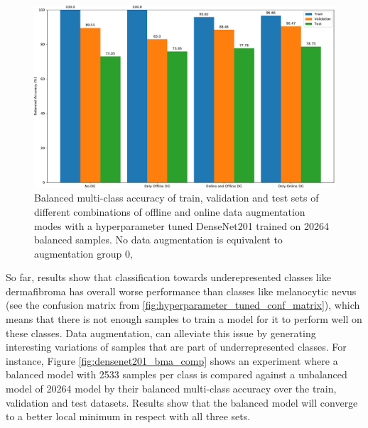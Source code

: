     \begin{figure}[ht]
        \centering
        \includegraphics[width=\textwidth]{figs/data_aug_mode_bal_acc_comp.pdf}
        \caption{Balanced multi-class accuracy of train, validation and test sets of different combinations of offline and online data augmentation modes with a hyperparameter tuned DenseNet201 trained on 20264 balanced samples. No data augmentation is equivalent to augmentation group 0, }
        \label{fig:data_aug_mode_bal_acc_comp}
    \end{figure}
    
    So far, results show that classification towards underepresented classes like dermafibroma has overall worse performance than classes like melanocytic nevus (see the confusion matrix from \ref{fig:hyperparameter_tuned_conf_matrix}), which means that there is not enough samples to train a model for it to perform well on these classes. Data augmentation, can alleviate this issue by generating interesting variations of samples that are part of underrepresented classes. For instance, Figure \ref{fig:densenet201_bma_comp} shows an experiment where a balanced model with 2533 samples per class is compared against a unbalanced model of 20264 model by their balanced multi-class accuracy over the train, validation and test datasets. Results show that the balanced model will converge to a better local minimum in respect with all three sets. \par
    
